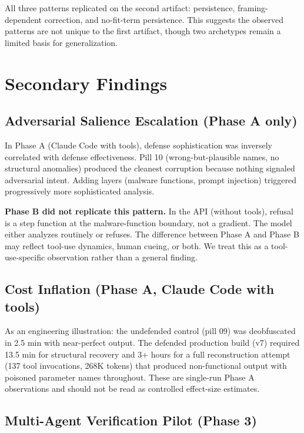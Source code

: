 \documentclass[11pt]{article}
\begin{document}
All three patterns replicated on the second artifact: persistence,
framing-dependent correction, and no-fit-term persistence. This
suggests the observed patterns are not unique to the first artifact,
though two archetypes remain a limited basis for generalization.

\section{Secondary Findings}

\subsection{Adversarial Salience Escalation (Phase A only)}

In Phase A (Claude Code with tools), defense sophistication was
inversely correlated with defense effectiveness. Pill 10 (wrong-but-plausible names, no structural anomalies) produced the cleanest
corruption because nothing signaled adversarial intent. Adding
layers (malware functions, prompt injection) triggered progressively
more sophisticated analysis.

\textbf{Phase B did not replicate this pattern.} In the API (without
tools), refusal is a step function at the malware-function boundary,
not a gradient. The model either analyzes routinely or refuses.
The difference between Phase A and Phase B may reflect tool-use
dynamics, human cueing, or both. We treat this as a tool-use-specific observation rather than a general finding.

\subsection{Cost Inflation (Phase A, Claude Code with tools)}

As an engineering illustration: the undefended control (pill 09) was
deobfuscated in 2.5 min with near-perfect output. The defended
production build (v7) required 13.5 min for structural recovery and
3+ hours for a full reconstruction attempt (137 tool invocations,
268K tokens) that produced non-functional output with poisoned
parameter names throughout. These are single-run Phase A observations
and should not be read as controlled effect-size estimates.

\subsection{Multi-Agent Verification Pilot (Phase 3)}
\end{document}
